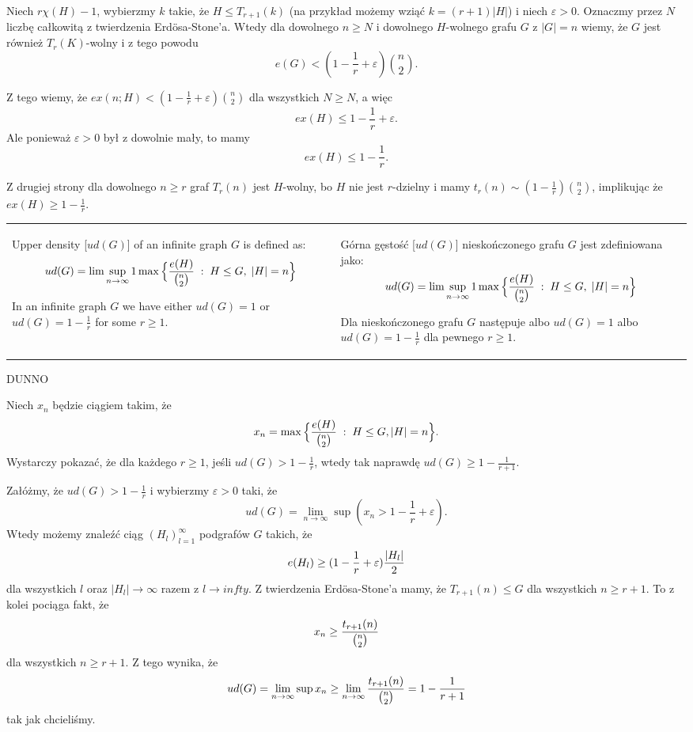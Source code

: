 Niech $r\chi(H)-1$, wybierzmy $k$ takie, że $H\leq T_{r+1}(k)$ (na przykład możemy wziąć $k=(r+1)|H|$) i niech $\varepsilon>0$. Oznaczmy przez $N$ liczbę całkowitą z twierdzenia Erd\"osa-Stone'a. Wtedy dla dowolnego $n\geq N$ i dowolnego $H$-wolnego grafu $G$ z $|G|=n$ wiemy, że $G$ jest również $T_r(K)$-wolny i z tego powodu
$$e(G)<(1-\frac1r+\varepsilon){n\choose 2}.$$

Z tego wiemy, że $ex(n;H)<(1-\frac1r+\varepsilon){n\choose 2}$ dla wszystkich $N\geq N$, a więc
$$ex(H)\leq 1-\frac1r+\varepsilon.$$
Ale ponieważ $\varepsilon>0$ był z dowolnie mały, to mamy
$$ex(H)\leq 1-\frac1r.$$

Z drugiej strony dla dowolnego $n\geq r$ graf $T_r(n)$ jest $H$-wolny, bo $H$ nie jest $r$-dzielny i mamy $t_r(n)\sim (1-\frac1r){n\choose 2}$, implikując że $ex(H)\geq 1-\frac1r$.
\medskip

\medskip


\begin{tabularx}{\textwidth}{ X!{\color{git90gray}\vrule} X }

    {\color{def}Upper density} [$ud(G)$] of an infinite graph $G$ is defined as:
    $$ud(G)=\lim\sup\limits_{n\to\infty}1\max\Big\{{e(H)\over{n\choose2}}\;:\;H\leq G,\;|H|=n\Big\}$$

    In an infinite graph $G$ we have either $ud(G)=1$ or $ud(G)=1-\frac1r$ for some $r\geq1$.

    &

    {\color{def}Górna gęstość} [$ud(G)$] nieskończonego grafu $G$ jest zdefiniowana jako:
    $$ud(G)=\lim\sup\limits_{n\to\infty}1\max\Big\{{e(H)\over{n\choose2}}\;:\;H\leq G,\;|H|=n\Big\}$$

    Dla nieskończonego grafu $G$ następuje albo $ud(G)=1$ albo $ud(G)=1-\frac1r$ dla pewnego $r\geq1$.

\end{tabularx}

\medskip

\medskip

DUNNO
\medskip

\medskip

Niech $x_n$ będzie ciągiem takim, że
$$x_n=\max\Big\{{e(H)\over{n\choose2}}\;:\;H\leq G,|H|=n\Big\}.$$
Wystarczy pokazać, że dla każdego $r\geq 1$, jeśli $ud(G)>1-\frac1r$, wtedy tak naprawdę $ud(G)\geq1-\frac1{r+1}$.
\smallskip

Załóżmy, że $ud(G)>1-\frac1r$ i wybierzmy $\varepsilon>0$ taki, że
$$ud(G)=\lim\limits_{n\to\infty}\sup (x_n>1-\frac1r+\varepsilon).$$
Wtedy możemy znaleźć ciąg $(H_l)_{l=1}^\infty$ podgrafów $G$ takich, że 
$$e(H_l)\geq(1-\frac1r+\varepsilon){|H_l|\over2}$$ 
dla wszystkich $l$ oraz $|H_l|\to\infty$ razem z $l\to infty$. Z twierdzenia Erd\"osa-Stone'a mamy, że $T_{r+1}(n)\leq G$ dla wszystkich $n\geq r+1$. To z kolei pociąga fakt, że
$$x_n\geq {t_{r+1}(n)\over {n\choose2}}$$
dla wszystkich $n\geq r+1$. Z tego wynika, że
$$ud(G)=\lim\limits_{n\to\infty}\sup x_n\geq \lim\limits_{n\to\infty}{t_{r+1}(n)\over{n\choose2}}=1-{1\over r+1}$$
tak jak chcieliśmy.